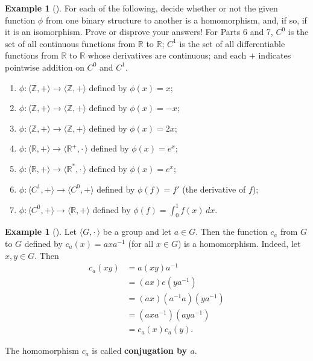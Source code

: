 \documentclass[10pt,]{book}
\newcommand{\terminology}[1]{\textbf{#1}}
\theoremstyle{plain}
\theoremstyle{definition}
\theoremstyle{definition}
\theoremstyle{definition}
\newtheorem{example}[theorem]{Example}
\theoremstyle{definition}
\numberwithin{equation}{section}
\def\Z{\mathbb{Z}}
\def\R{\mathbb{R}}
\def\Gdot{\langle G, \cdot\,\rangle}
\newcommand{\amp}{&}
\begin{document}
\begin{example}[]\label{homos}
For each of the following, decide whether or not the given function \(\phi\) from one binary structure to another is a homomorphism, and, if so, if it is an isomorphism. Prove or disprove your answers! For Parts 6 and 7, \(C^0\) is the set of all continuous functions from \(\R\) to \(\R\); \(C^1\) is the set of all differentiable functions from \(\R\) to \(\R\) whose derivatives are continuous; and each \(+\) indicates pointwise addition on \(C^0\) and \(C^1\). \leavevmode%
\begin{enumerate}
\item\hypertarget{li-136}{}\(\phi:\langle \Z,+\rangle \to \langle \Z,+\rangle\) defined by \(\phi(x)=x\);%
\item\hypertarget{li-137}{}\(\phi:\langle \Z,+\rangle \to \langle \Z,+\rangle\) defined by \(\phi(x)=-x\);%
\item\hypertarget{li-138}{}\(\phi:\langle \Z,+\rangle \to \langle \Z,+\rangle\) defined by \(\phi(x)=2x\);%
\item\hypertarget{li-139}{}\(\phi:\langle \R,+\rangle \to \langle \R^+,\cdot\,\rangle\) defined by \(\phi(x)=e^x\);%
\item\hypertarget{li-140}{}\(\phi:\langle \R,+\rangle \to \langle \R^*,\cdot\,\rangle\) defined by \(\phi(x)=e^x\);%
\item\hypertarget{li-141}{}\label{notation-47}
 \(\phi:\langle C^1,+\rangle \to \langle C^0,+\rangle\) defined by \(\phi(f)=f'\) (the derivative of \(f\));%
\item\hypertarget{li-142}{}\label{notation-48}
 \(\phi:\langle C^0,+\rangle \to \langle \R,+\rangle\) defined by \(\phi(f)=\displaystyle{\int_0^1 f(x)\, dx}\).%
\end{enumerate}
%
\end{example}
\begin{example}[]\label{example-27}
\label{notation-49}
 Let \(\Gdot\) be a group and let \(a\in G\). Then the function \(c_a\) from \(G\) to \(G\) defined by \(c_a(x)=axa^{-1}\) (for all \(x\in G\)) is a homomorphism. Indeed, let \(x,y\in G\). Then%
\begin{align*}
c_a(xy)\amp =a(xy)a^{-1}\\
\amp =(ax)e(ya^{-1})\\
\amp =(ax)(a^{-1}a)(ya^{-1})\\
\amp =(axa^{-1})(aya^{-1})\\
\amp =c_a(x)c_a(y).
\end{align*}
%
\par
The homomorphism \(c_a\) is called \terminology{conjugation by \(a\)}.%
\end{example}
\end{document}
